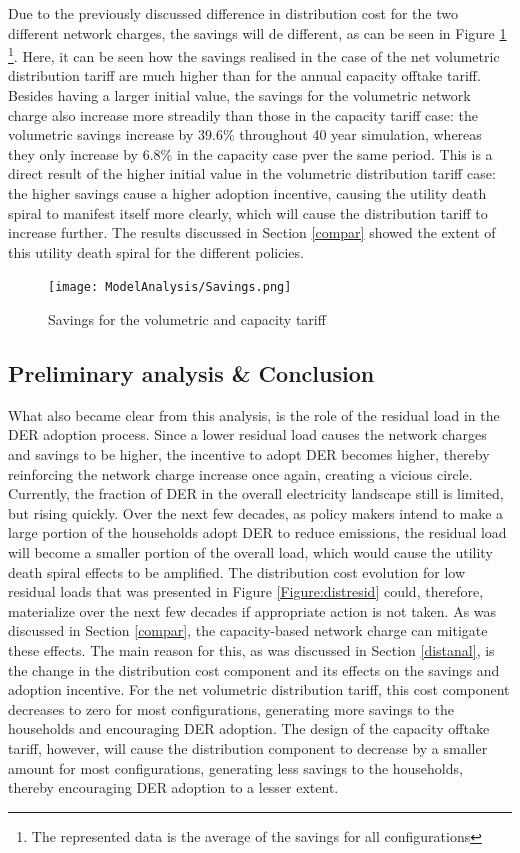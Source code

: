 Due to the previously discussed difference in distribution cost for the two different network charges, the savings will de different, as can be seen in Figure \ref{Figure:Savings} \footnote{The represented data is the average of the savings for all configurations}. Here, it can be seen how the savings realised in the case of the net volumetric distribution tariff are much higher than for the annual capacity offtake tariff. Besides having a larger initial value, the savings for the volumetric network charge also increase more streadily than those in the capacity tariff case: the volumetric savings increase by 39.6\% throughout 40 year simulation, whereas they only increase by 6.8\% in the capacity case pver the same period. This is a direct result of the higher initial value in the volumetric distribution tariff case: the higher savings cause a higher adoption incentive, causing the utility death spiral to manifest itself more clearly, which will cause the distribution tariff to increase further. The results discussed in Section \ref{compar} showed the extent of this utility death spiral for the different policies. 
\begin{figure}[h!]
\centering
\texttt{[image: ModelAnalysis/Savings.png]}
\caption{Savings for the volumetric and capacity tariff}
\label{Figure:Savings}
\end{figure}
\subsection{Preliminary analysis \& Conclusion}
What also became clear from this analysis, is the role of the residual load in the DER adoption process. Since a lower residual load causes the network charges and savings to be higher, the incentive to adopt DER becomes higher, thereby reinforcing the network charge increase once again, creating a vicious circle. Currently, the fraction of DER in the overall electricity landscape still is limited, but rising quickly. Over the next few decades, as policy makers intend to make a large portion of the households adopt DER to reduce emissions, the residual load will become a smaller portion of the overall load, which would cause the utility death spiral effects to be amplified. The distribution cost evolution for low residual loads that was presented in Figure \ref{Figure:distresid} could, therefore, materialize over the next few decades if appropriate action is not taken. As was discussed in Section \ref{compar}, the capacity-based network charge can mitigate these effects. The main reason for this, as was discussed in Section \ref{distanal}, is the change in the distribution cost component and its effects on the savings and adoption incentive. For the net volumetric distribution tariff, this cost component decreases to zero for most configurations, generating more savings to the households and encouraging DER adoption. The design of the capacity offtake tariff, however, will cause the distribution component to decrease by a smaller amount for most configurations, generating less savings to the households, thereby encouraging DER adoption to a lesser extent. 
\newline \newline \noindent
